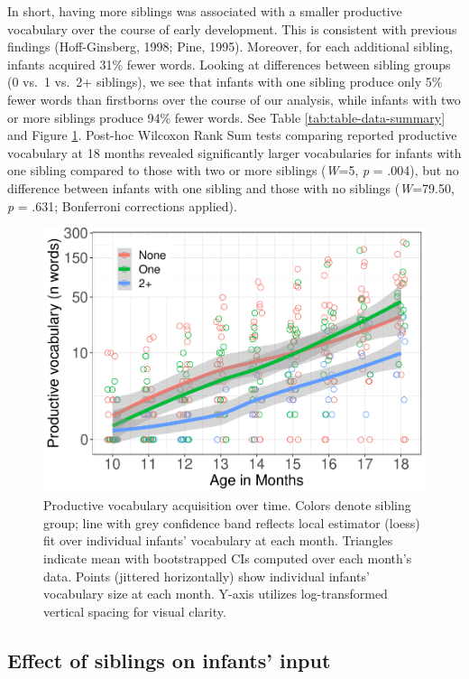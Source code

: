 \documentclass[
  english,
  man,floatsintext]{apa6}
\begin{document}
In short, having more siblings was associated with a smaller productive vocabulary over the course of early development. This is consistent with previous findings (Hoff-Ginsberg, 1998; Pine, 1995). Moreover, for each additional sibling, infants acquired 31\% fewer words. Looking at differences between sibling groups (0 vs.~1 vs.~2+ siblings), we see that infants with one sibling produce only 5\% fewer words than firstborns over the course of our analysis, while infants with two or more siblings produce 94\% fewer words. See Table \ref{tab:table-data-summary} and Figure \ref{fig:Figure-SibGroup}. Post-hoc Wilcoxon Rank Sum tests comparing reported productive vocabulary at 18 months revealed significantly larger vocabularies for infants with one sibling compared to those with two or more siblings (\emph{W}=5, \emph{p} = .004), but no difference between infants with one sibling and those with no siblings (\emph{W}=79.50, \emph{p} = .631; Bonferroni corrections applied).

\begin{figure}
\centering
\includegraphics{SiblingsStudyText_files/figure-latex/Figure-SibGroup-1.pdf}
\caption{\label{fig:Figure-SibGroup}Productive vocabulary acquisition over time. Colors denote sibling group; line with grey confidence band reflects local estimator (loess) fit over individual infants' vocabulary at each month. Triangles indicate mean with bootstrapped CIs computed over each month's data. Points (jittered horizontally) show individual infants' vocabulary size at each month. Y-axis utilizes log-transformed vertical spacing for visual clarity.}
\end{figure}

\hypertarget{effect-of-siblings-on-infants-input}{%
\subsection{Effect of siblings on infants' input}\label{effect-of-siblings-on-infants-input}}
\end{document}
